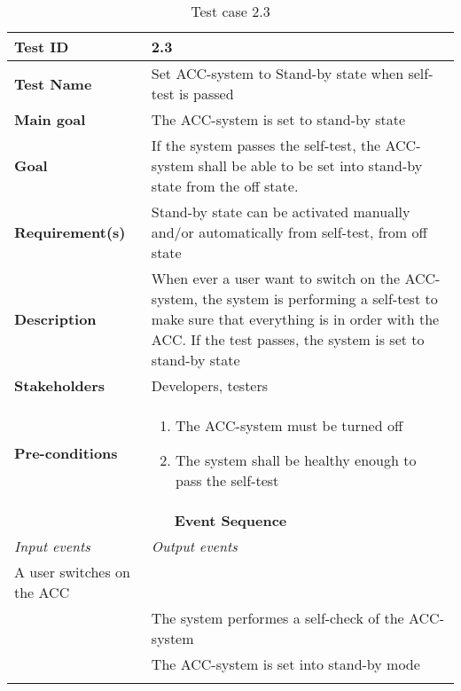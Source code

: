 \begin{table}[H]
\centering
\begin{tabularx}{\linewidth}{X|X}
    \hline
    \textbf{Test ID} & 2.3\\
    \hline
    \textbf{Test Name} & Set ACC-system to Stand-by state when self-test is passed \\
    \hline
    \textbf{Main goal} & The ACC-system is set to stand-by state \\
    \hline
    \textbf{Goal} & If the system passes the self-test, the ACC-system shall be able to be set into stand-by state from the off state. \\
    \hline
    \textbf{Requirement(s)} & Stand-by state can be activated manually and/or automatically from self-test, from off state \\
    \hline
    \textbf{Description} & When ever a user want to switch on the ACC-system, the system is performing a self-test to make sure that everything is in order with the ACC. If the test passes, the system is set to stand-by state\\
    \hline
    \textbf{Stakeholders} & Developers, testers \\
    \hline
    \textbf{Pre-conditions} & \begin{enumerate}
        \item The ACC-system must be turned off
        \item The system shall be healthy enough to pass the self-test
    \end{enumerate} \\
    \hline
    \multicolumn{2}{c}{\textbf{Event Sequence}} \\
    \hline
    \textit{Input events} & \textit{Output events} \\
    \hline
    A user switches on the ACC &  \\
    \hline
     & The system performes a self-check of the ACC-system \\
    \hline
     & The ACC-system is set into stand-by mode \\
    \hline
     &  \\
    \hline
\end{tabularx}
\caption{\label{tab_case2_3} Test case 2.3}
\end{table}

